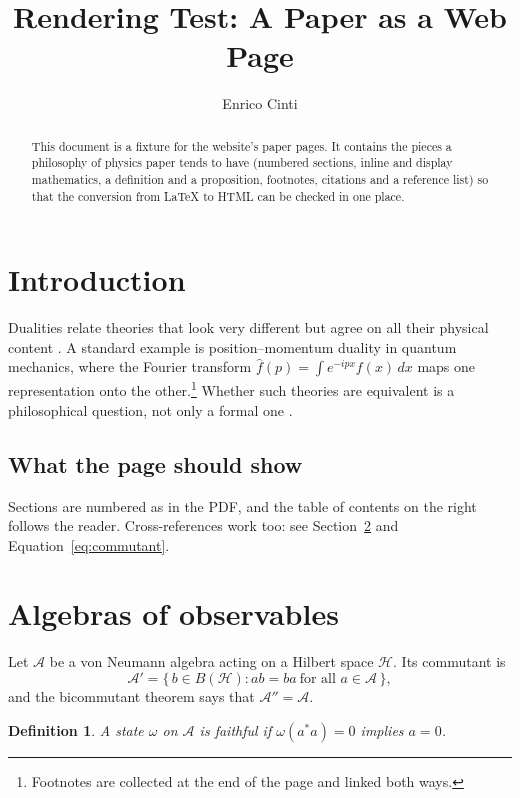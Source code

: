 \documentclass[11pt]{article}
\title{Rendering Test: A Paper as a Web Page}
\author{Enrico Cinti}
\date{}
\newtheorem{definition}{Definition}
\newcommand{\Alg}{\mathcal{A}}
\newcommand{\Hilb}{\mathcal{H}}
\begin{document}
\maketitle

\begin{abstract}
This document is a fixture for the website's paper pages. It contains the
pieces a philosophy of physics paper tends to have (numbered sections,
inline and display mathematics, a definition and a proposition, footnotes,
citations and a reference list) so that the conversion from LaTeX to HTML
can be checked in one place.
\end{abstract}

\section{Introduction}

Dualities relate theories that look very different but agree on all their
physical content \citep{deharo2016}. A standard example is position--momentum
duality in quantum mechanics, where the Fourier transform
$\hat{f}(p) = \int e^{-ipx} f(x)\,dx$ maps one representation onto the
other.\footnote{Footnotes are collected at the end of the page and linked
both ways.} Whether such theories are equivalent is a philosophical question,
not only a formal one \citep{butterfield2021}.

\subsection{What the page should show}

Sections are numbered as in the PDF, and the table of contents on the right
follows the reader. Cross-references work too: see
Section~\ref{sec:algebras} and Equation~\eqref{eq:commutant}.

\section{Algebras of observables}
\label{sec:algebras}

Let $\Alg$ be a von Neumann algebra acting on a Hilbert space $\Hilb$. Its
commutant is
\begin{equation}
  \Alg' = \{\, b \in B(\Hilb) : ab = ba \ \text{for all } a \in \Alg \,\},
  \label{eq:commutant}
\end{equation}
and the bicommutant theorem says that $\Alg'' = \Alg$.

\begin{definition}
A state $\omega$ on $\Alg$ is \emph{faithful} if $\omega(a^*a) = 0$
implies $a = 0$.
\end{definition}
\end{document}
